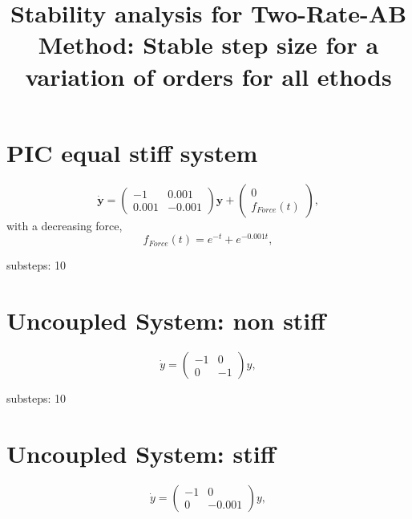 \documentclass[a4paper,10pt]{article}
\title{Stability analysis for Two-Rate-AB Method: Stable step size for a variation of orders for all ethods}
\author{}
\begin{document}
\maketitle


\section{PIC equal stiff system}
\begin{equation}
 \dot{\textbf{y}} = \left(
        \begin{array}{cc}
           -1 & 0.001\\
           0.001  & -0.001
        \end{array}
     \right) \textbf{y} + \left(
        \begin{array}{c}
           0 \\
           f_{Force}(t)
        \end{array}
     \right),
\label{ExtForceStiff}
\end{equation}
with a decreasing force,
\begin{equation}
 f_{Force}(t) = e^{-t} + e^{-0.001t},
\end{equation}

substeps: 10\\




\section{Uncoupled System: non stiff}
\begin{equation}
 \dot{y}= \left( 
        \begin{array}{cc}
           -1 & 0 \\
            0 & -1
        \end{array}
     \right) y,
\end{equation}

substeps: 10\\


\section{Uncoupled System: stiff}
\begin{equation}
 \dot{y}= \left( 
        \begin{array}{cc}
           -1 & 0 \\
            0 & -0.001
        \end{array}
     \right) y,
\end{equation}
\end{document}
